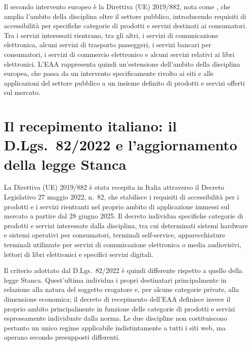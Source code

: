 Il secondo intervento europeo è la Direttiva (UE) 2019/882, nota come , che amplia l'ambito della disciplina oltre il settore pubblico, introducendo requisiti di accessibilità per specifiche categorie di prodotti e servizi destinati ai consumatori. Tra i servizi interessati rientrano, tra gli altri, i servizi di comunicazione elettronica, alcuni servizi di trasporto passeggeri, i servizi bancari per consumatori, i servizi di commercio elettronico e alcuni servizi relativi ai libri elettronici. L'EAA rappresenta quindi un'estensione dell'ambito della disciplina europea, che passa da un intervento specificamente rivolto ai siti e alle applicazioni  del settore pubblico a un insieme definito di prodotti e servizi offerti sul mercato.

\section{Il recepimento italiano: il D.Lgs.~82/2022 e l'aggiornamento della legge Stanca}

La Direttiva (UE) 2019/882 è stata recepita in Italia attraverso il Decreto Legislativo 27 maggio 2022, n.~82, che stabilisce i requisiti di accessibilità per i prodotti e i servizi rientranti nel proprio ambito di applicazione immessi sul mercato a partire dal 28 giugno 2025. Il decreto individua specifiche categorie di prodotti e servizi interessate dalla disciplina, tra cui determinati sistemi hardware e sistemi operativi per consumatori, terminali self-service, apparecchiature terminali utilizzate per servizi di comunicazione elettronica o media audiovisivi, lettori di libri elettronici e specifici servizi digitali.

Il criterio adottato dal D.Lgs.~82/2022 è quindi differente rispetto a quello della legge Stanca. Quest'ultima individua i propri destinatari principalmente in relazione alla natura del soggetto erogatore e, per alcune categorie private, alla dimensione economica; il decreto di recepimento dell'EAA definisce invece il proprio ambito principalmente in funzione delle categorie di prodotti e servizi espressamente individuate dalla norma. Le due discipline non costituiscono pertanto un unico regime applicabile indistintamente a tutti i siti web, ma operano secondo presupposti differenti.

